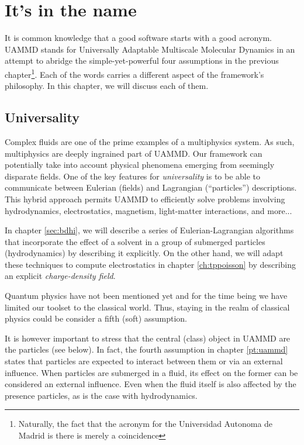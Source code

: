 \documentclass[ twoside,openright,titlepage,numbers=noenddot,%
headinclude,footinclude,cleardoublepage=empty,abstract=on,
BCOR=5mm,paper=a4,fontsize=11pt, dvipsnames
]{scrreprt}
\newcommand{\uammd}{\gls{UAMMD}\xspace}
\begin{document}
\chapter{It's in the name}\label{ch:design}

It is common knowledge that a good software starts with a good acronym. \uammd stands for Universally Adaptable Multiscale Molecular Dynamics in an attempt to abridge the simple-yet-powerful four assumptions in the previous chapter\footnote{Naturally, the fact that the acronym for the Universidad Autonoma de Madrid is there is merely a coincidence}. Each of the words carries a different aspect of the framework's philosophy. In this chapter, we will discuss each of them.
\section{\uppercase{\textbf{U}}niversality}

Complex fluids are one of the prime examples of a multiphysics system. As such, multiphysics are deeply ingrained part of \uammd. Our framework can potentially take into account physical phenomena emerging from seemingly disparate fields.
One of the key features for \emph{universality} is to be able to communicate between Eulerian (fields) and Lagrangian (``particles'') descriptions. This hybrid approach permits \uammd to efficiently solve problems involving hydrodynamics, electrostatics, magnetism, light-matter interactions, and more... 
  
In chapter \ref{sec:bdhi}, we will describe a series of Eulerian-Lagrangian algorithms that incorporate the effect of a solvent in a group of submerged particles (hydrodynamics) by describing it explicitly. On the other hand, we will adapt these techniques to compute electrostatics in chapter \ref{ch:tppoisson} by describing an explicit \emph{charge-density field}.

Quantum physics have not been mentioned yet and for the time being we have limited our toolset to the classical world. Thus, staying in the realm of classical physics could be consider a fifth (soft) assumption.

It is however important to stress that the central (class) object in \uammd are the particles (see below). In fact, the fourth assumption in chapter \ref{pt:uammd} states that particles are expected to interact between them or via an external influence. When particles are submerged in a fluid, its effect on the former can be considered an external influence. Even when the fluid itself is also affected by the presence particles, as is the case with hydrodynamics.
\end{document}
